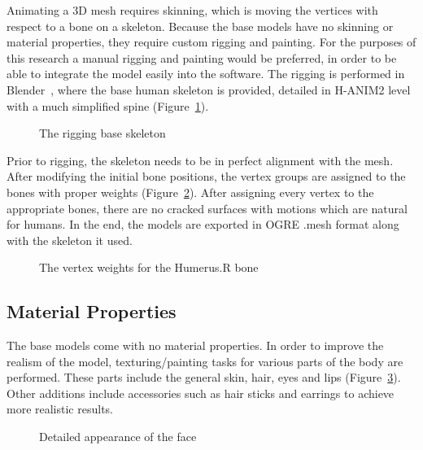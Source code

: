 Animating a 3D mesh requires skinning, which is moving the vertices with respect to a bone on a skeleton. Because the base models have no skinning or material properties, they require custom rigging and painting. For the purposes of this research a manual rigging and painting would be preferred, in order to be able to integrate the model easily into the software. The rigging is performed in Blender~\cite{Blender}, where the base human skeleton is provided, detailed in H-ANIM2 level with a much simplified spine (Figure~\ref{fig:rigging_skeleton}). 

\begin{figure}[h]
\centerline{}
\caption{The rigging base skeleton}
\label{fig:rigging_skeleton}
\end{figure}

Prior to rigging, the skeleton needs to be in perfect alignment with the mesh. After modifying the initial bone positions, the vertex groups are assigned to the bones with proper weights (Figure~\ref{fig:weight_humerus_r}).
After assigning every vertex to the appropriate bones, there are no cracked surfaces with motions which are natural for humans. In the end, the models are exported in OGRE .mesh format along with the skeleton it used.

\begin{figure}[h]
\centerline{}
\caption{The vertex weights for the Humerus.R bone}
\label{fig:weight_humerus_r}
\end{figure}

\subsection{Material Properties}

The base models come with no material properties. In order to improve the realism of the model, texturing/painting tasks for various parts of the body are performed. These parts include the general skin, hair, eyes and lips (Figure~\ref{fig:detailed_face}). Other additions include accessories such as hair sticks and earrings to achieve more realistic results.

\begin{figure}[h]
\centerline{}
\caption{Detailed appearance of the face}
\label{fig:detailed_face}
\end{figure}

